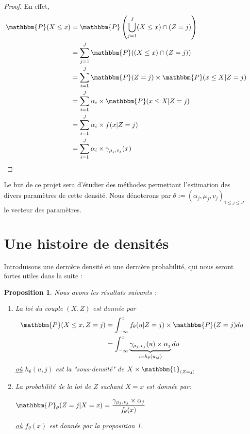 \documentclass[frenchb]{report}
\newcommand{\1}{\mathbbm{1}}
\newcommand{\prob}{\mathbbm{P}}
\newtheorem{prop}{Proposition}
\theoremstyle{definition}\newtheorem{defn}{Définition}
\theoremstyle{definition}\newtheorem{exm}{Exemple}
\theoremstyle{definition}\newtheorem{nota}{Notation}
\theoremstyle{definition}\newtheorem{rem}{Remarque}
\begin{document}
\begin{proof}
En effet, 
\begin{align*}
\prob(X\leq x) &= \prob\left(\bigcup_{j=1}^J (X\leq x)\cap(Z=j)\right)\\
&=\displaystyle\sum_{j=1}^J \prob((X\leq x)\cap(Z=j))\\
&=\displaystyle\sum_{i=1}^J\prob(Z=j)\times\prob(x\leq X | Z = j) \\
&=\displaystyle\sum_{i=1}^J\alpha_i\times\prob(x\leq X | Z = j) \\
&=\displaystyle\sum_{i=1}^J\alpha_i\times f(x| Z = j) \\
&= \displaystyle\sum_{i=1}^J\alpha_i\times \gamma_{\mu_j, v_j}(x)
\end{align*}

\end{proof}

Le but de ce projet sera d'étudier des méthodes permettant l'estimation des divers paramètres de cette densité. Nous dénoterons par $\theta := (\alpha_j, \mu_j, v_j)_{1\leq j\leq J}$ le vecteur des paramètres.

\section{Une histoire de densités}

Introduisons une dernière densité et une dernière probabilité, qui nous seront fortes utiles dans la suite : 

\begin{prop} Nous avons les résultats suivants :
\begin{enumerate}
\item La loi du couple $(X,Z)$ est donnée par 
\begin{align*} 
\prob(X\leq x, Z = j) &= \displaystyle\int_{-\infty}^x f_\theta(u | Z = j)\times\prob(Z=j)du\\
&= \displaystyle\int_{-\infty}^x  \underbrace{\gamma_{\mu_j, v_j}(u) \times \alpha_j }_{:= h_\theta(u,j)}du
\end{align*}
\underline{où} $h_\theta(u,j)$ est la "sous-densité" de $X\times\1_{(Z=j)}$
\item La probabilité de la loi de $Z$ sachant $X=x$ est donnée par:
\begin{center} $\prob_\theta(Z = j | X = x)=\displaystyle \frac{\gamma_{\mu_j, v_j}\times\alpha_j}{f_\theta(x)}$ \end{center}
\underline{où} $f_\theta(x)$ est donnée par la proposition 1.
\end{enumerate}
\end{prop}
\end{document}
